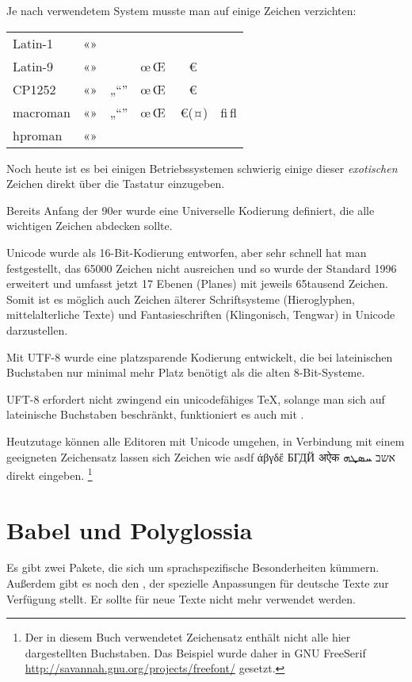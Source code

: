 Je nach verwendetem System musste man auf einige Zeichen verzichten:

\begin{tabular}{lccccc}
    Latin-1		& «» 	& 		&	&	&	\\
    Latin-9		& «» 	&		& œ\,Œ	& €	&	\\
    CP1252		& «» 	& „“”	& œ\,Œ	& €	&	\\
    macroman	& «» 	& „“”	& œ\,Œ	& €(¤)	& ﬁ\,ﬂ	\\
    hproman		& «» 	& 		&	&	&	\\
\end{tabular}

Noch heute ist es bei einigen Betriebssystemen schwierig einige dieser 
\emph{exotischen} Zeichen direkt über die Tastatur einzugeben.

Bereits Anfang der 90er wurde eine Universelle Kodierung definiert,
die alle wichtigen Zeichen abdecken sollte.

Unicode wurde als 16-Bit-Kodierung entworfen, aber sehr schnell hat man festgestellt,
das 65000 Zeichen nicht ausreichen und so wurde der Standard 1996
erweitert und umfasst jetzt 17 Ebenen (Planes) mit jeweils 65tausend
Zeichen. Somit ist es möglich auch Zeichen älterer Schriftsysteme
(Hieroglyphen, mittelalterliche Texte) und Fantasieschriften (Klingonisch,
Tengwar) in Unicode darzustellen.

Mit UTF-8 wurde eine platzsparende Kodierung entwickelt, die bei lateinischen Buchstaben
nur minimal mehr Platz benötigt als die alten 8-Bit-Systeme.

UFT-8 erfordert nicht zwingend ein unicodefähiges \TeX{}, solange man sich auf
lateinische Buchstaben beschränkt, funktioniert es auch mit \pdfTeX{}.

Heutzutage können alle Editoren mit Unicode umgehen, in Verbindung mit einem geeigneten
Zeichensatz lassen sich Zeichen wie {\FSEfont asdf άβγδἔ БГДЙ अऐक אשב ܚܤܜܗ} direkt eingeben.%
\footnote{Der in diesem Buch verwendetet Zeichensatz enthält nicht alle hier dargestellten Buchstaben.
Das Beispiel wurde daher in GNU FreeSerif \url{http://savannah.gnu.org/projects/freefont/} gesetzt.}

\section{Babel und Polyglossia}
Es gibt zwei Pakete, die sich um sprachspezifische Besonderheiten kümmern.
Außerdem gibt es noch den , der spezielle Anpassungen für deutsche Texte
zur Verfügung stellt. Er sollte für neue Texte nicht mehr verwendet werden.

